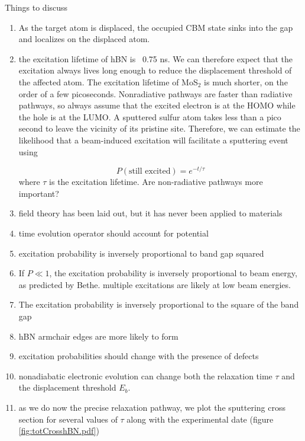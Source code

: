 \documentclass{article}
\begin{document}
Things to discuss
\begin{enumerate}
    \item As the target atom is displaced, the occupied CBM state sinks into the gap and localizes on the displaced atom\cite{Kretschmer2020}.
    \item the excitation lifetime of hBN is ~0.75 ns\cite{Li2016b}.  We can therefore expect that the excitation always lives long enough to reduce the displacement threshold of the affected atom.  The excitation lifetime of MoS$_2$ is much shorter, on the order of a few picoseconds\cite{Korn2011,Lagarde2014,Palummo2015}.  Nonradiative pathways are faster than radiative pathways\cite{Shi2013}, so always assume that the excited electron is at the HOMO while the hole is at the LUMO.  A sputtered sulfur atom takes less than a pico second to leave the vicinity of its pristine site\cite{Yoshimura2018}.  Therefore, we can estimate the likelihood that a beam-induced excitation will facilitate a sputtering event using
    
    \begin{equation}
        P(\text{still excited})
        =
        e^{-t/\tau}
    \end{equation}
    where $\tau$ is the excitation lifetime.
    Are non-radiative pathways more important?
    \item field theory has been laid out, but it has never been applied to materials
    \item time evolution operator should account for potential
    \item excitation probability is inversely proportional to band gap squared
    \item If $P \ll 1$, the excitation probability is inversely proportional to beam energy, as predicted by Bethe\cite{Kretschmer2020}.  multiple excitations are likely at low beam energies.
    \item The excitation probability is inversely proportional to the square of the band gap
    \item hBN armchair edges are more likely to form\cite{Cretu2015}
    \item excitation probabilities should change with the presence of defects
    \item nonadiabatic electronic evolution can change both the relaxation time
      $\tau$ and the displacement threshold $E_b$.
    \item as we do now the precise relaxation pathway, we plot the sputtering
      cross section for several values of $\tau$ along with the experimental
      date (figure \ref{fig:totCrosshBN.pdf})
\end{enumerate}
\end{document}

